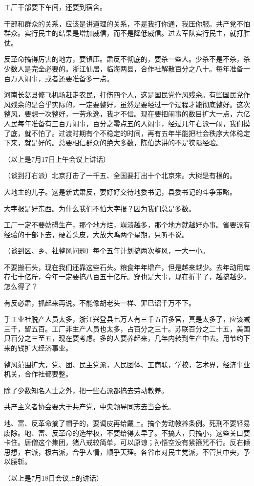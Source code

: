 工厂干部要下车间，还要到宿舍。

干部和群众的关系，应该是讲道理的关系，不是我打你通，我压你服。共产党不怕群众。实行民主的结果是增加威信，而不是降低威信。过去军队实行民主，就打胜仗。

反革命搞得厉害的地方，要镇压。肃反不彻底的，要杀一些人。少杀不是不杀，杀少数人是完全必要的。浙江仙居，临海两县，合作社解散百分之八十。每年准备一百万人闹事，或者还要准备多一点。

河南长葛县修飞机场赶走农民，打伤四个人，这是国民党作风残余。有些国民党作风残余的是合乎实际的，一定要整好，虽然是要经过一个过程才能彻底整好。这次整风，要想一次整好，一劳永逸，我才不信。现在要把闹事的数目扩大一点，六亿人民每年准备有三百万闹事，百分之零点五的人闹事，经过几年右派一闹，我们摸了底，就不怕了。过渡时期有个不稳定的时间，再有五年半能把社会秩序大体稳定下来，就是好的。总要相信群众的绝大多数，陈伯达讲的不是狭隘经验。

（以上是7月17日上午会议上讲话）

（谈到打右派）北京打击了一千五、全国要打出十个北京来。大树是有根的。

大地主的儿子。这是新式肃反，要好好交待地委书记，县委书记的斗争策略。

大字报是好东西。为什么我们不怕大字报？因为我们总是多数。

工厂一定不要妨碍生产，那个地方烂，崩溃越多，那个地方就越好办事。省要派有经验的干部下去，硬着头皮，大放大鸣两个星期，只听不说。

（谈到区、乡、社整风问题）每个五年计划搞两次整风，一大一小。

不要搬石头，现在我们还靠这些石头。粮食年年增产，但是越来越少。去年动用库存七十亿斤，今年一定要搞八百五十亿斤。穿也是大事，现在折半了，越搞越少。怎么得了？

有反必肃，抓起来再说。不能像胡老头一样、罪已诏千万不下。

手工业社脱产人员太多，浙江兴登县七万人有三千五百多官，真是太多了，应该减三千，留五百。工厂非生产人员也太多，占百分之三十。苏联百分之二十五，美国只百分之三至五，现在要考虑。多的人要养起来，几年内转到生产中去。用节约下来的钱扩大经济事业。

整风范围扩大，党、团、民主党派，人民团体、工商联，学校，艺术界，经济事业机关，合作社都要整。

除了少数知名人士之外，把一些右派都搞去劳动教养。

共产主义者协会要大于共产党，中央领导同志去当会长。

地、富、反革命摘了帽子的，要调皮再给戴上。搞个劳动教养条例。死刑不要轻易废除。地、富、反革命的选举权，不要给得太早了。不搞大，只搞小，这些关口要卡住。唐僧这个集团，猪八戒较简单，可以原谅；孙悟空没有紧箍咒不行。反右倾思想，右派，极右派，合乎人情，顺乎天理。各省市对民主党派，不管其中央，予以腰斩。

（以上是7月18日会议上的讲话）


